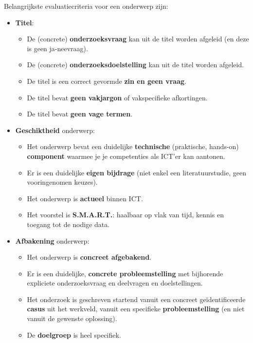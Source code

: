 Belangrijkste evaluatiecriteria voor een onderwerp zijn:


\begin{itemize}
  \item \textbf{Titel}:
  \begin{itemize}
    \item De (concrete) \textbf{onderzoeksvraag} kan uit de titel worden afgeleid (en deze is geen ja-neevraag).
    \item De (concrete) \textbf{onderzoeksdoelstelling} kan uit de titel worden afgeleid.
    \item De titel is een correct gevormde \textbf{zin en geen vraag}.
    \item De titel bevat \textbf{geen vakjargon} of vakspecifieke afkortingen.
    \item De titel bevat \textbf{geen vage termen}.
  \end{itemize}
  \item \textbf{Geschiktheid} onderwerp:
  \begin{itemize}
    \item Het onderwerp bevat een duidelijke \textbf{technische} (praktische, hands-on) \textbf{component} waarmee je je competenties als ICT'er kan aantonen. 
    \item Er is een duidelijke \textbf{eigen bijdrage} (niet enkel een literatuurstudie, geen vooringenomen keuzes). 
    \item Het onderwerp is \textbf{actueel} binnen ICT.
    \item Het voorstel is \textbf{S.M.A.R.T.}: haalbaar op vlak van tijd, kennis en toegang tot de nodige data.
  \end{itemize}
  \item \textbf{Afbakening} onderwerp:
  \begin{itemize}
    \item Het onderwerp is \textbf{concreet afgebakend}. 
    \item Er is een duidelijke, \textbf{concrete probleemstelling} met bijhorende explicie\-te onderzoeksvraag en deelvragen en doelstellingen.
    \item Het onderzoek is geschreven startend vanuit een concreet geïdentificeer\-de \textbf{casus} uit het werkveld, vanuit een specifieke \textbf{probleemstelling} (en niet vanuit de gewenste oplossing).
    \item De \textbf{doelgroep} is heel specifiek. 
  \end{itemize}
\end{itemize}
